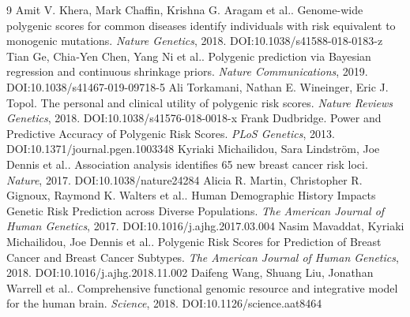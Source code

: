 \documentclass[11pt]{article}
\begin{document}
\begin{thebibliography}{9}
 Amit V. Khera, Mark Chaffin, Krishna G. Aragam et al.. Genome-wide polygenic scores for common diseases identify individuals with risk equivalent to monogenic mutations. \emph{Nature Genetics}, 2018. DOI:10.1038/s41588-018-0183-z
 Tian Ge, Chia‐Yen Chen, Yang Ni et al.. Polygenic prediction via Bayesian regression and continuous shrinkage priors. \emph{Nature Communications}, 2019. DOI:10.1038/s41467-019-09718-5
 Ali Torkamani, Nathan E. Wineinger, Eric J. Topol. The personal and clinical utility of polygenic risk scores. \emph{Nature Reviews Genetics}, 2018. DOI:10.1038/s41576-018-0018-x
 Frank Dudbridge. Power and Predictive Accuracy of Polygenic Risk Scores. \emph{PLoS Genetics}, 2013. DOI:10.1371/journal.pgen.1003348
 Kyriaki Michailidou, Sara Lindström, Joe Dennis et al.. Association analysis identifies 65 new breast cancer risk loci. \emph{Nature}, 2017. DOI:10.1038/nature24284
 Alicia R. Martin, Christopher R. Gignoux, Raymond K. Walters et al.. Human Demographic History Impacts Genetic Risk Prediction across Diverse Populations. \emph{The American Journal of Human Genetics}, 2017. DOI:10.1016/j.ajhg.2017.03.004
 Nasim Mavaddat, Kyriaki Michailidou, Joe Dennis et al.. Polygenic Risk Scores for Prediction of Breast Cancer and Breast Cancer Subtypes. \emph{The American Journal of Human Genetics}, 2018. DOI:10.1016/j.ajhg.2018.11.002
 Daifeng Wang, Shuang Liu, Jonathan Warrell et al.. Comprehensive functional genomic resource and integrative model for the human brain. \emph{Science}, 2018. DOI:10.1126/science.aat8464
\end{thebibliography}
\end{document}
